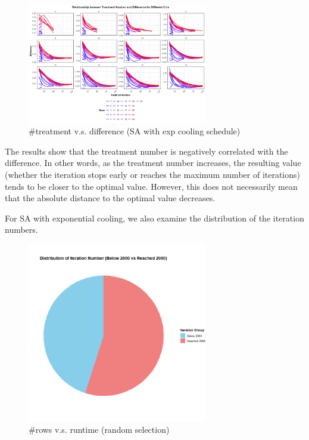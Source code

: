 \documentclass[
  a4paper,
  oneside,
  openany,
  12pt,
  onecolumn]{book}
\theoremstyle{definition}
\theoremstyle{plain}
\theoremstyle{remark}
\begin{document}
\begin{figure}[H]

{\centering \includegraphics[width=0.7\textwidth,height=\textheight]{images/Rplots/SA-Slow-eva/SA-Slow-trt-vs-diff.png}

}

\caption{\#treatment v.s. difference (SA with exp cooling schedule)}

\end{figure}%

The results show that the treatment number is negatively correlated with
the difference. In other words, as the treatment number increases, the
resulting value (whether the iteration stops early or reaches the
maximum number of iterations) tends to be closer to the optimal value.
However, this does not necessarily mean that the absolute distance to
the optimal value decreases.

For SA with exponential cooling, we also examine the distribution of the
iteration numbers.

\begin{figure}[H]

{\centering \includegraphics[width=0.7\textwidth,height=\textheight]{images/Rplots/SA-Fast-eva/SA-Fast-iternum-distribution.png}

}

\caption{\#rows v.s. runtime (random selection)}

\end{figure}%
\end{document}
